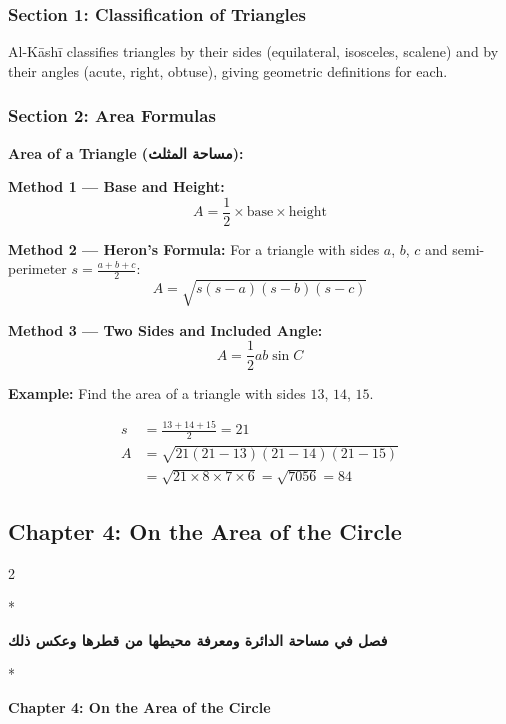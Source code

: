 \documentclass[11pt,a4paper]{article}
\newcommand{\ar}[1]{\arabicfont\beginR #1\endR}
\newenvironment{bilingual}{%
  \vspace{0.3em}%
  \begin{paracol}{2}%
}{%
  \end{paracol}%
  \vspace{0.3em}%
}
\newenvironment{mathalgo}{%
  \par\vspace{0.3cm}
  \begin{framed}
  \setlength{\parindent}{0pt}
}{%
  \end{framed}
  \par\vspace{0.3cm}
}
\begin{document}
\subsubsection{Section 1: Classification of Triangles}

Al-K\=ash\=i classifies triangles by their sides (equilateral, isosceles,
scalene) and by their angles (acute, right, obtuse), giving geometric
definitions for each.

\subsubsection{Section 2: Area Formulas}

\begin{mathalgo}
\textbf{Area of a Triangle (\ar{مساحة المثلث}):}

\textbf{Method 1 --- Base and Height:}
\[
A = \frac{1}{2} \times \text{base} \times \text{height}
\]

\textbf{Method 2 --- Heron's Formula:}
For a triangle with sides $a$, $b$, $c$ and semi-perimeter $s =
\frac{a+b+c}{2}$:
\[
A = \sqrt{s(s-a)(s-b)(s-c)}
\]

\textbf{Method 3 --- Two Sides and Included Angle:}
\[
A = \frac{1}{2} ab \sin C
\]
\end{mathalgo}

\noindent\textbf{Example:} Find the area of a triangle with sides $13$,
$14$, $15$.

\begin{align*}
s &= \frac{13 + 14 + 15}{2} = 21 \\
A &= \sqrt{21(21-13)(21-14)(21-15)} \\
&= \sqrt{21 \times 8 \times 7 \times 6} = \sqrt{7056} = 84
\end{align*}

\subsection{Chapter 4: On the Area of the Circle}

\begin{bilingual}
\switchcolumn[0]*
\begin{center}
\textbf{\color{chapcolor}\ar{فصل في مساحة الدائرة ومعرفة محيطها من قطرها وعكس ذلك}}
\end{center}
\switchcolumn[1]*
\begin{center}
\textbf{\color{chapcolor}Chapter 4: On the Area of the Circle}
\end{center}
\end{bilingual}
\end{document}
